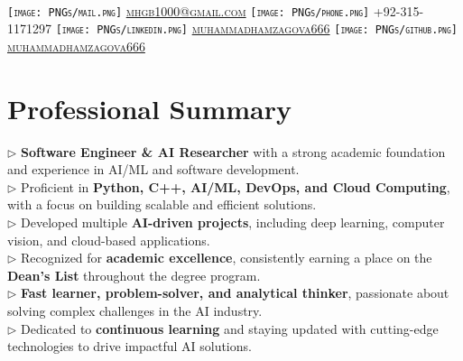 \documentclass[]{resume-openfont}
\begin{document}
\newcommand{\yourName}{Muhammad Hamza}
\newcommand{\yourEmail}{mhgb1000@gmail.com}
\newcommand{\yourPhone}{+92-315-1171297}
\newcommand{\githubUserName}{muhammadhamzagova666}
\newcommand{\linkedInUserName}{muhammadhamzagova666}

\begin{center}
    \Huge \scshape \latoRegular{\yourName} \\ \vspace{1pt}
    \small \texttt{[image: PNGs/mail.png]} \href{mailto:\yourEmail}{\yourEmail} \textbullet{} \texttt{[image: PNGs/phone.png]} \yourPhone \textbullet{} \texttt{[image: PNGs/linkedin.png]} \href{https://www.linkedin.com/in/\linkedInUserName}{\linkedInUserName} \textbullet{} \texttt{[image: PNGs/github.png]} \href{https://github.com/\githubUserName}{\githubUserName}
\end{center}

\section{Professional Summary}
$\triangleright$ \textbf{Software Engineer \& AI Researcher} with a strong academic foundation and experience in AI/ML and software development.\\
$\triangleright$ Proficient in \textbf{Python, C++, AI/ML, DevOps, and Cloud Computing}, with a focus on building scalable and efficient solutions.\\
$\triangleright$ Developed multiple \textbf{AI-driven projects}, including deep learning, computer vision, and cloud-based applications.\\
$\triangleright$ Recognized for \textbf{academic excellence}, consistently earning a place on the \textbf{Dean’s List} throughout the degree program.\\
$\triangleright$ \textbf{Fast learner, problem-solver, and analytical thinker}, passionate about solving complex challenges in the AI industry.\\
$\triangleright$ Dedicated to \textbf{continuous learning} and staying updated with cutting-edge technologies to drive impactful AI solutions.\\
\end{document}

